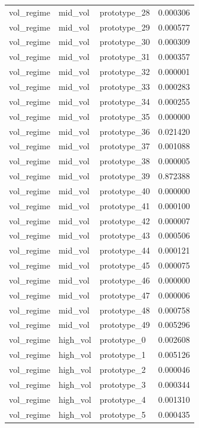 \begin{tabular}{lllr}
vol\_regime & mid\_vol & prototype\_28 & 0.000306 \\
vol\_regime & mid\_vol & prototype\_29 & 0.000577 \\
vol\_regime & mid\_vol & prototype\_30 & 0.000309 \\
vol\_regime & mid\_vol & prototype\_31 & 0.000357 \\
vol\_regime & mid\_vol & prototype\_32 & 0.000001 \\
vol\_regime & mid\_vol & prototype\_33 & 0.000283 \\
vol\_regime & mid\_vol & prototype\_34 & 0.000255 \\
vol\_regime & mid\_vol & prototype\_35 & 0.000000 \\
vol\_regime & mid\_vol & prototype\_36 & 0.021420 \\
vol\_regime & mid\_vol & prototype\_37 & 0.001088 \\
vol\_regime & mid\_vol & prototype\_38 & 0.000005 \\
vol\_regime & mid\_vol & prototype\_39 & 0.872388 \\
vol\_regime & mid\_vol & prototype\_40 & 0.000000 \\
vol\_regime & mid\_vol & prototype\_41 & 0.000100 \\
vol\_regime & mid\_vol & prototype\_42 & 0.000007 \\
vol\_regime & mid\_vol & prototype\_43 & 0.000506 \\
vol\_regime & mid\_vol & prototype\_44 & 0.000121 \\
vol\_regime & mid\_vol & prototype\_45 & 0.000075 \\
vol\_regime & mid\_vol & prototype\_46 & 0.000000 \\
vol\_regime & mid\_vol & prototype\_47 & 0.000006 \\
vol\_regime & mid\_vol & prototype\_48 & 0.000758 \\
vol\_regime & mid\_vol & prototype\_49 & 0.005296 \\
vol\_regime & high\_vol & prototype\_0 & 0.002608 \\
vol\_regime & high\_vol & prototype\_1 & 0.005126 \\
vol\_regime & high\_vol & prototype\_2 & 0.000046 \\
vol\_regime & high\_vol & prototype\_3 & 0.000344 \\
vol\_regime & high\_vol & prototype\_4 & 0.001310 \\
vol\_regime & high\_vol & prototype\_5 & 0.000435 \\

\end{tabular}
